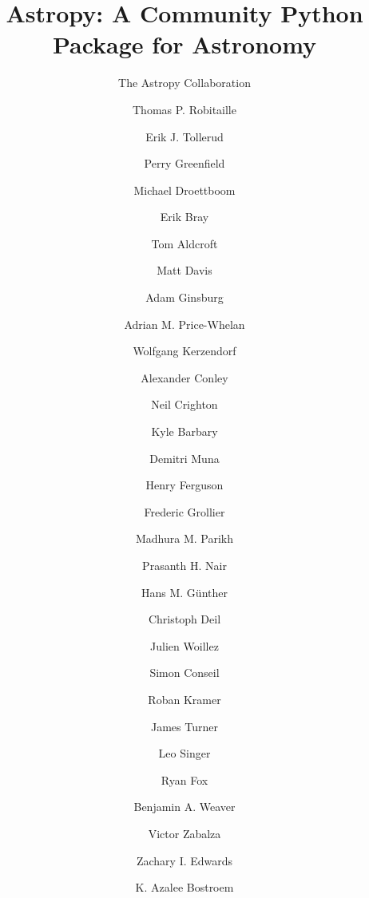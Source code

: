 \documentclass[traditabstract]{aa}
\begin{document}



\title{Astropy: A Community Python Package for Astronomy}




\author{
The Astropy Collaboration
  \and
Thomas P. Robitaille\inst{\ref{inst:mpia}}  %
  \and
Erik J. Tollerud\inst{\ref{inst:yale}, \ref{inst:hubble}}  %
  \and
Perry Greenfield\inst{\ref{inst:stsci}}  %
  \and
Michael Droettboom\inst{\ref{inst:stsci}}  %
  \and
Erik Bray\inst{\ref{inst:stsci}}  %
  \and
Tom Aldcroft\inst{\ref{inst:cfa}}  %
  \and
Matt Davis\inst{\ref{inst:stsci}}  %
  \and
Adam Ginsburg\inst{\ref{inst:colorado}}  %
  \and
Adrian M. Price-Whelan\inst{\ref{inst:columbia}}  %
  \and
Wolfgang Kerzendorf\inst{\ref{inst:toronto}}  %
  \and
Alexander Conley\inst{\ref{inst:colorado}}
  \and
Neil Crighton\inst{\ref{inst:mpia}}  %
  \and
Kyle Barbary\inst{\ref{inst:argonne}}  %
  \and
Demitri Muna\inst{\ref{inst:osu}}  %
  \and
Henry Ferguson\inst{\ref{inst:stsci}}
  \and
Frederic Grollier
  \and
Madhura M. Parikh\inst{\ref{inst:surat}}  %
  \and
Prasanth H. Nair\inst{\ref{inst:freelance}}  %
  \and
Hans M. G\"unther\inst{\ref{inst:cfa}}  %
  \and
Christoph Deil\inst{\ref{inst:mpik}}  %
  \and
Julien Woillez\inst{\ref{inst:eso_garching}}  %
  \and
Simon Conseil\inst{\ref{inst:oamp}}
  \and
Roban Kramer\inst{\ref{inst:eth}}  %
  \and
James Turner\inst{\ref{inst:gemini_s}}  %
  \and
Leo Singer\inst{\ref{inst:ligo}}  %
  \and
Ryan Fox\inst{\ref{inst:freelance}}  %
  \and
Benjamin A. Weaver\inst{\ref{inst:nyu}}  %
  \and
Victor Zabalza\inst{\ref{inst:mpik}}  %
  \and
Zachary I. Edwards\inst{\ref{inst:louisiana}}  %
  \and
K. Azalee Bostroem\inst{\ref{inst:stsci}}  %
}
\end{document}
